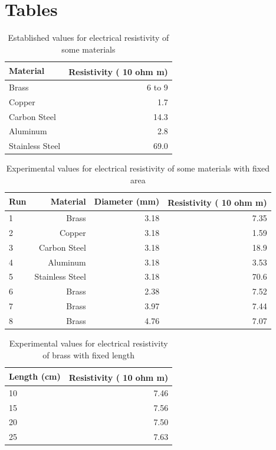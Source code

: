 \section{Tables}
%
\begin{table}[ht]
	\centering
	\begin{tabular}{l|r}
		\textbf{Material} & \textbf{Resistivity} ({\texttimes} 10\textsuperscript{\textminus 8} ohm {\textperiodcentered} m) \\
		\hline
		Brass & 6 to 9 \\
		Copper & 1.7 \\
		Carbon Steel & 14.3 \\
		Aluminum & 2.8 \\
		Stainless Steel & 69.0 \\
		\hline
	\end{tabular}
	\caption{Established values for electrical resistivity of some materials}
	\label{table.02.established}
\end{table}
%
\begin{table}[ht]
	\centering
	\begin{tabular}{l|r|r|r}
		\textbf{Run} & \textbf{Material} & \textbf{Diameter} (mm) & \textbf{Resistivity} ({\texttimes} 10\textsuperscript{\textminus 8} ohm {\textperiodcentered} m) \\
		\hline
		1 & Brass & 3.18 & 7.35 \\
		2 & Copper & 3.18 & 1.59 \\
		3 & Carbon Steel & 3.18 & 18.9 \\
		4 & Aluminum & 3.18 & 3.53 \\
		5 & Stainless Steel & 3.18 & 70.6 \\
		6 & Brass & 2.38 & 7.52 \\
		7 & Brass & 3.97 & 7.44 \\
		8 & Brass & 4.76 & 7.07 \\
		\hline
	\end{tabular}
	\caption{Experimental values for electrical resistivity of some materials with fixed area}
	\label{table.02.experimental.area}
\end{table}
%
\begin{table}[ht]
	\centering
	\begin{tabular}{l|r}
		\textbf{Length} (cm) & \textbf{Resistivity} ({\texttimes} 10\textsuperscript{\textminus 8} ohm {\textperiodcentered} m) \\
		\hline
		10 & 7.46 \\
		15 & 7.56 \\
		20 & 7.50 \\
		25 & 7.63 \\
		\hline
	\end{tabular}
	\caption{Experimental values for electrical resistivity of brass with fixed length}
	\label{table.02.experimental.length}
\end{table}
%
\FloatBarrier
\newpage
